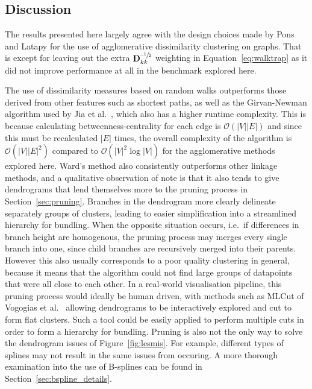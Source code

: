 \subsection{Discussion}
The results presented here largely agree with the design choices made by Pons and Latapy \cite{Pons2006} for the use of agglomerative dissimilarity clustering on graphs. That is except for leaving out the extra $\mathbf{D}_{kk}^{\text{--}\sfrac{1}{2}}$ weighting in Equation~\ref{eq:walktrap} as it did not improve performance at all in the benchmark explored here.

The use of dissimilarity measures based on random walks outperforms those derived from other features such as shortest paths, as well as the Girvan-Newman algorithm used by Jia et al.\ \cite{Jia2011}, which also has a higher runtime complexity.
This is because calculating betweenness-centrality for each edge is $\mathcal{O}(|V||E|)$ \cite{Brandes2001a} and since this must be recalculated $|E|$ times, the overall complexity of the algorithm is $\mathcal{O}(|V||E|^2)$ compared to $\mathcal{O}(|V|^2\log|V|)$ for the agglomerative methods explored here.
Ward's method also consistently outperforms other linkage methods, and a qualitative observation of note is that it also tends to give dendrograms that lend themselves more to the pruning process in Section~\ref{sec:pruning}. Branches in the dendrogram more clearly delineate separately groups of clusters, leading to easier simplification into a streamlined hierarchy for bundling.
When the opposite situation occurs, i.e.\ if differences in branch height are homogenous, the pruning process may merges every single branch into one, since child branches are recursively merged into their parents. However this also usually corresponds to a poor quality clustering in general, because it means that the algorithm could not find large groups of datapoints that were all close to each other.
In a real-world visualisation pipeline, this pruning process would ideally be human driven, with methods such as MLCut of Vogogias et al.\ \cite{Vogogias2016} allowing dendrograms to be interactively explored and cut to form flat clusters. Such a tool could be easily applied to perform multiple cuts in order to form a hierarchy for bundling.
Pruning is also not the only way to solve the dendrogram issues of Figure~\ref{fig:lesmis}. For example, different types of splines may not result in the same issues from occuring.
A more thorough examination into the use of B-splines can be found in Section~\ref{sec:bspline_details}.

